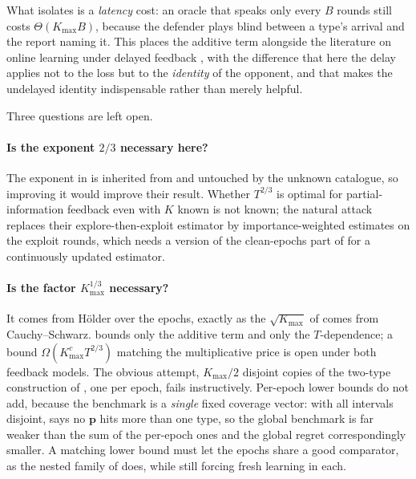 \documentclass[letterpaper,9pt,twocolumn]{extarticle}
\newcommand{\pvec}{\mathbf{p}}
\newcommand{\Kmax}{K_{\max}}
\theoremstyle{plain}
\theoremstyle{definition}
\theoremstyle{remark}
\begin{document}
What  isolates is a \emph{latency} cost: an oracle
that speaks only every $B$ rounds still costs $\Theta(\Kmax B)$, because
the defender plays blind between a type's arrival and the report naming
it. This places the additive term alongside the literature on online
learning under delayed feedback \citep{joulani2013}, with the difference
that here the delay applies not to the loss but to the \emph{identity}
of the opponent, and that  makes the undelayed
identity indispensable rather than merely helpful.

Three questions are left open.

\paragraph{Is the exponent $2/3$ necessary here?}
The exponent in  is inherited from
\citet[Theorem 6.1]{balcan2015} and untouched by the unknown catalogue, so
improving it would improve their result. Whether $T^{2/3}$ is optimal for
partial-information feedback even with $K$ known is not known; the natural
attack replaces their explore-then-exploit estimator by importance-weighted
estimates on the exploit rounds, which needs a version of the
clean-epochs part of  for a continuously updated estimator.

\paragraph{Is the factor $\Kmax^{1/3}$ necessary?}
It comes from H\"older over the epochs, exactly as the $\sqrt{\Kmax}$ of
 comes from Cauchy--Schwarz.  bounds only
the additive term and  only the $T$-dependence; a bound
$\Omega(\Kmax^{c}T^{2/3})$ matching the multiplicative price is open under
both feedback models. The obvious attempt, $\Kmax/2$ disjoint copies of
the two-type construction of , one per epoch, fails
instructively. Per-epoch lower bounds do not add, because the benchmark
 is a \emph{single} fixed coverage vector: with all intervals
disjoint,  says no $\pvec$ hits more than one type, so the
global benchmark is far weaker than the sum of the per-epoch ones and the
global regret correspondingly smaller. A matching lower bound must let the
epochs share a good comparator, as the nested family of 
does, while still forcing fresh learning in each.
\end{document}
